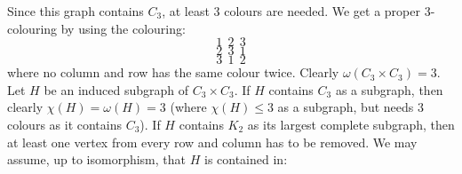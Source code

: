 \documentclass[letterpaper, 11pt]{article}
\newcommand{\1}{\mathds{1}}	%
\theoremstyle{definition}
\begin{document}
\begin{center}
\end{center}
Since this graph contains $C_3$, at least 3 colours are needed. We get a proper 3-colouring by using the colouring:
\[
1 \ \ 2 \ \ 3
\]\[
2 \ \ 3 \ \ 1
\]\[
3 \ \ 1 \ \ 2
\]
where no column and row has the same colour twice. Clearly $\omega (C_3 \times C_3) = 3$. Let $H$ be an induced subgraph of $C_3 \times C_3$. If $H$ contains $C_3$ as a subgraph, then clearly $\chi (H) = \omega (H) = 3$ (where $\chi (H) \le 3$ as a subgraph, but needs 3 colours as it contains $C_3$). If $H$ contains $K_2$ as its largest complete subgraph, then at least one vertex from every row and column has to be removed. We may assume, up to isomorphism, that $H$ is contained in:
\end{document}
